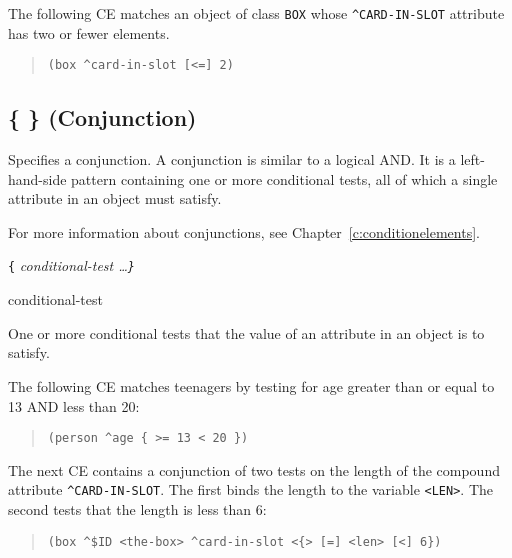 \Example

The following CE matches an object of class \verb|BOX| whose
\verb|^CARD-IN-SLOT| attribute has two or fewer elements.

\begin{quote}
\begin{verbatim}
(box ^card-in-slot [<=] 2)
\end{verbatim}
\end{quote}

\subsection{\co\{ \co\} (Conjunction)}

Specifies a conjunction. A conjunction is similar to a logical AND. It
is a left-hand-side pattern containing one or more conditional tests,
all of which a single attribute in an object must satisfy.

For more information about conjunctions, see
Chapter~\ref{c:conditionelements}.

\Format

\verb|{| \it{conditional-test} \ldots\verb|}|

\begin{operands}
\item[conditional-test]

  One or more conditional tests that the value of an attribute in an
  object is to satisfy.
\end{operands}

\Example

The following CE matches teenagers by testing for age greater than or
equal to 13 AND less than 20:

\begin{quote}
\begin{verbatim}
(person ^age { >= 13 < 20 })
\end{verbatim}
\end{quote}

The next CE contains a conjunction of two tests on the length of the
compound attribute \verb|^CARD-IN-SLOT|. The first binds the length to
the variable \verb|<LEN>|. The second tests that the length is less
than 6:

\begin{quote}
\begin{verbatim}
(box ^$ID <the-box> ^card-in-slot <{> [=] <len> [<] 6})
\end{verbatim}
\end{quote}

